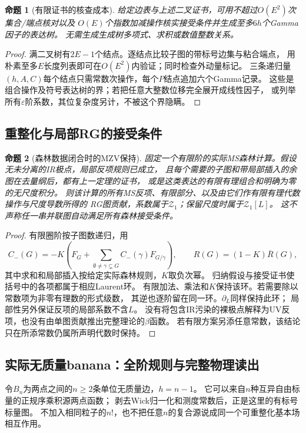 \documentclass[11pt,a4paper]{ctexart}
\theoremstyle{cnplain}\newtheorem{theorem}{定理}[section]
\newtheorem{proposition}[theorem]{命题}
\theoremstyle{definition}\newtheorem{definition}[theorem]{定义}
\theoremstyle{remark}\newtheorem{remark}[theorem]{注}
\begin{document}
\begin{proposition}[有限证书的核查成本]\label{prop:masslesscertificate}
给定边表与上述二叉证书，可用不超过$O(E^2)$次集合/端点核对以及
$O(E)$个指数加减操作核实接受条件并生成至多$6h$个Gamma因子的表达树。
无需生成生成树多项式、求积或数值整数关系。
\end{proposition}
\begin{proof}
满二叉树有$2E-1$个结点。逐结点比较子图的带标号边集与粘合端点，
用朴素至多$E$长度列表即可在$O(E^2)$内验证；同时检查外动量标记。
三条递归量$(h,A,C)$每个结点只需常数次操作，每个$P$结点追加六个Gamma记录。
这些是组合操作及符号表达树的界；若把任意大整数位移完全展开成线性因子，
或列举所有$\varepsilon$阶系数，其位复杂度另计，不被这个界隐瞒。
\end{proof}

\subsection{重整化与局部RG的接受条件}
\begin{proposition}[森林数据闭合时的MZV保持]\label{prop:masslessforestclosure}
固定一个有限阶的实际MS森林计算。假设无未分离的IR极点，局部反项规则已成立，
且每个需要的子图和带局部插入的余图在去量纲后，都有上一定理的证书，
或是这类表达的有限有理组合和明确为零的无尺度积分。
则该计算的所有MS反项、有限部分、以及由它们作有限有理代数操作与尺度导数所得的
RG图贡献，系数属于$\mathcal Z_1$；保留尺度时属于$\mathcal Z_1[L]$。
这不声称任一串并联图自动满足所有森林接受条件。
\end{proposition}
\begin{proof}
有限圈阶按子图数递归，用
\[
 C_-(G)=-K\!\left(F_G+
 \sum_{\emptyset\ne\gamma\subsetneq G}C_-(\gamma)F_{G/\gamma}\right),
 \qquad R(G)=(1-K)\overline R(G),
\]
其中求和和局部插入按给定实际森林规则，$K$取负次幂。
归纳假设与接受证书使括号中的各项都属于相应Laurent环。
有限加法、乘法和$K$保持该环。若需要除以常数项为非零有理数的形式级数，
其逆也逐阶留在同一环。$\partial_L$同样保持此环；
局部性另外保证反项的局部系数不含$L$。
没有将包含IR污染的裸极点解释为UV反项，也没有由单图贡献推出完整理论的$\beta$函数。
若有限方案另添任意常数，该结论只在所添常数仍属所声明代数时保持。
\end{proof}

\subsection{实际无质量banana：全阶规则与完整物理读出}
令$B_n$为两点之间的$n\ge2$条单位无质量边，$h=n-1$。
它可以来自$n$种互异自由标量的正规序乘积源两点函数；
剥去Wick归一化和测度常数后，正是这里的有标号标量图。
不加入相同粒子的$n!$，也不把任意$n$的复合源说成同一个可重整化基本场相互作用。
\end{document}
